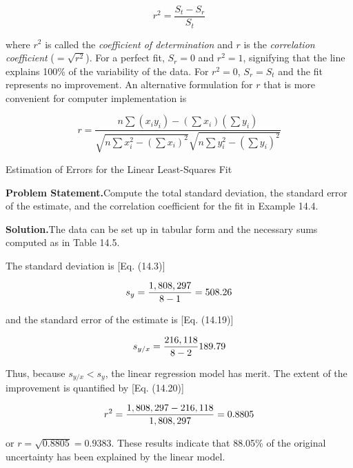 \documentclass[../main.tex]{subfiles}
\begin{document}
\begin{equation}
	\tag{14.20}
	r^2 = \frac{S_t - S_r}{S_t}
\end{equation}

\noindent where $r^2$ is called the \textit{coefficient of determination} and $r$ is the \textit{correlation coefficient} ($=\sqrt{r^2}$). For a perfect fit, $S_r = 0$ and $r^2 = 1$, signifying that the line explains 100\% of the variability of the data. For $r^2 = 0$, $S_r = S_t$ and the fit represents no improvement. An alternative formulation for $r$ that is more convenient for computer implementation is

\begin{equation}
	\tag{14.21}
	r = \frac{n \sum (x_i y_i) - (\sum x_i) (\sum y_i)}{\sqrt{n \sum x^2_i - (\sum x_i)^2} \sqrt{n \sum y^2_i - (\sum y_i)^2}}
\end{equation}

\begin{example} Estimation of Errors for the Linear Least-Squares Fit

    \noindent\textbf{Problem Statement.}\quad Compute the total standard deviation, the standard error of the estimate, and the correlation coefficient for the fit in Example 14.4.

    \noindent\textbf{Solution.}\quad  The data can be set up in tabular form and the necessary sums computed as in Table 14.5.


    The standard deviation is [Eq. (14.3)]

	\begin{equation}
		\notag
		s_y = \frac{1,808,297}{8-1}=508.26
	\end{equation}

	\noindent and the standard error of the estimate is [Eq. (14.19)]

	\begin{equation}
		\notag
		s_{y/x} = \frac{216,118}{8-2}189.79
	\end{equation}

	\noindent Thus, because $s_{y/x} < s_y$, the linear regression model has merit. The extent of the improvement is quantified by [Eq. (14.20)]

	\begin{equation}
		\notag
		r^2 = \frac{1,808,297 - 216,118}{1,808,297} = 0.8805
	\end{equation}

	\noindent or $r = \sqrt{0.8805} = 0.9383$. These results indicate that 88.05\% of the original uncertainty has been explained by the linear model.
\end{example}
\end{document}
